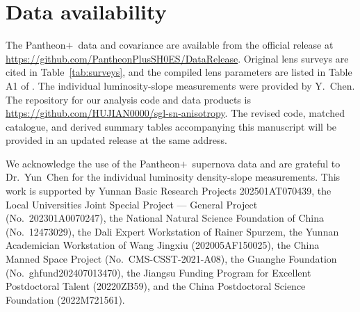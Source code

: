 \documentclass{aa}
\newcommand{\pantheon}{Pantheon$+$}
\begin{document}
\section*{Data availability}\label{sec:data_avail}
The \pantheon\ data and covariance are available from the official release at \url{https://github.com/PantheonPlusSH0ES/DataRelease}. Original lens surveys are cited in Table~\ref{tab:surveys}, and the compiled lens parameters are listed in Table A1 of \citet{stz1902}. The individual luminosity-slope measurements were provided by Y.~Chen. The repository for our analysis code and data products is \url{https://github.com/HUJIAN0000/sgl-sn-anisotropy}. The revised code, matched catalogue, and derived summary tables accompanying this manuscript will be provided in an updated release at the same address.

\begin{acknowledgements}

We acknowledge the use of the \pantheon\ supernova data and are grateful to
Dr.~Yun~Chen for the individual luminosity density-slope measurements. This work is
supported by Yunnan Basic Research Projects 202501AT070439, the Local
Universities Joint Special Project --- General Project (No.~202301A0070247), the
National Natural Science Foundation of China (No.~12473029), the Dali Expert
Workstation of Rainer Spurzem, the Yunnan Academician Workstation of Wang Jingxiu
(202005AF150025), the China Manned Space Project (No.~CMS-CSST-2021-A08), the
Guanghe Foundation (No.~ghfund202407013470), the Jiangsu Funding Program for
Excellent Postdoctoral Talent (20220ZB59), and the China Postdoctoral Science
Foundation (2022M721561).

\end{acknowledgements}
\end{document}
